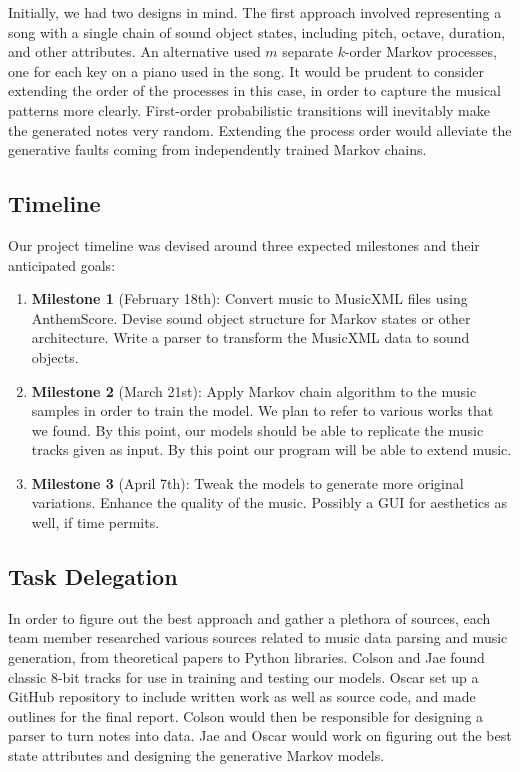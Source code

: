 \documentclass{article}
\begin{document}
Initially, we had two designs in mind. The first approach involved representing a song with a single chain of sound object states, including pitch, octave, duration, 
and other attributes. An alternative used $m$ separate $k$-order Markov processes, one for each key on a piano used in the song. It would be prudent to consider extending 
the order of the processes in this case, in order to capture the musical patterns more clearly. First-order probabilistic transitions will inevitably make the generated 
notes very random. Extending the process order would alleviate the generative faults coming from independently trained Markov chains.

\subsection{Timeline}
Our project timeline was devised around three expected milestones and their anticipated goals:
\begin{enumerate}
  \item \textbf{Milestone 1} (February 18th): Convert music to MusicXML files using AnthemScore. Devise sound object structure for Markov states or other architecture. 
  Write a parser to transform the MusicXML data to sound objects. 
  \item \textbf{Milestone 2} (March 21st): Apply Markov chain algorithm to the music samples in order to train the model. We plan to refer to various works that we found.
  By this point, our models should be able to replicate the music tracks given as input. By this point our program will be able to extend music.
  \item \textbf{Milestone 3} (April 7th): Tweak the models to generate more original variations. Enhance the quality of the music. Possibly a GUI for aesthetics as well, 
  if time permits.
\end{enumerate}

\subsection{Task Delegation}
In order to figure out the best approach and gather a plethora of sources, each team member researched various sources related to music data parsing and music generation, 
from theoretical papers to Python libraries. Colson and Jae found classic 8-bit tracks for use in training and testing our models. Oscar set up a GitHub repository to include 
written work as well as source code, and made outlines for the final report. Colson would then be responsible for designing a parser to turn notes into data. Jae and Oscar 
would work on figuring out the best state attributes and designing the generative Markov models. 
\end{document}
